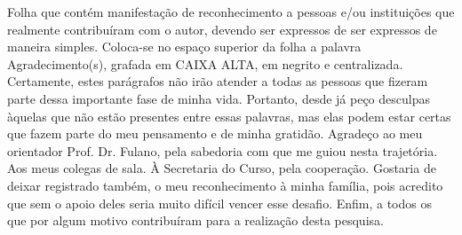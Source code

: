 \begin{agradecimentos}  
    Folha que contém manifestação de reconhecimento a pessoas e/ou
    instituições que realmente contribuíram com o autor, devendo ser expressos de ser
    expressos de maneira simples. Coloca-se no espaço superior da folha a palavra
    Agradecimento(s), grafada em CAIXA ALTA, em negrito e centralizada.\\    
    Certamente, estes parágrafos não irão atender a todas as pessoas que
    fizeram parte dessa importante fase de minha vida. Portanto, desde já peço
    desculpas àquelas que não estão presentes entre essas palavras, mas elas podem
    estar certas que fazem parte do meu pensamento e de minha gratidão.
    Agradeço ao meu orientador Prof. Dr. Fulano, pela sabedoria com que me
    guiou nesta trajetória.
    Aos meus colegas de sala.
    À Secretaria do Curso, pela cooperação.
    Gostaria de deixar registrado também, o meu reconhecimento à minha
    família, pois acredito que sem o apoio deles seria muito difícil vencer esse desafio.
    Enfim, a todos os que por algum motivo contribuíram para a realização desta
    pesquisa.

\end{agradecimentos}